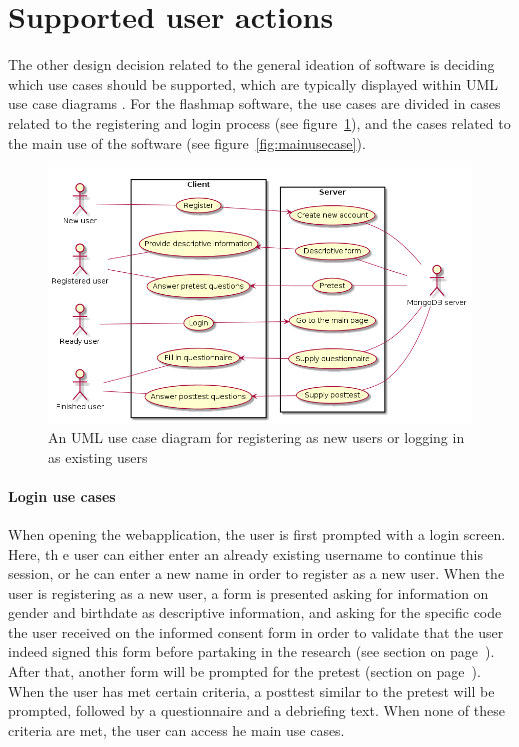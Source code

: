 \section{Supported user actions}

The other design decision related to the general ideation of software is deciding which use cases should be supported, which are typically displayed within UML use case diagrams \cite{uml}. For the flashmap software, the use cases are divided in cases related to the registering and login process (see figure~\ref{fig:loginusecase}), and the cases related to the main use of the software (see figure~\ref{fig:mainusecase}).

\begin{figure}[h!]
\centering
\includegraphics[width=\textwidth]{img/loginusecase.png}
\caption{An UML use case diagram for registering as new users or logging in as existing users}
\label{fig:loginusecase}
\end{figure}

\paragraph{Login use cases} When opening the webapplication, the user is first prompted with a login screen. Here, th e user can either enter an already existing username to continue this session, or he can enter a new name in order to register as a new user. When the user is registering as a new user, a form is presented asking for information on gender and birthdate as descriptive information, and asking for the specific code the user received on the informed consent form in order to validate that the user indeed signed this form before partaking in the research (see section  on page~\pageref{sec:procedure}). After that, another form will be prompted for the pretest (section  on page~\pageref{sec:instrumentation}). When the user has met certain criteria, a posttest similar to the pretest will be prompted, followed by a questionnaire and a debriefing text. When none of these criteria are met, the user can access he main use cases.

